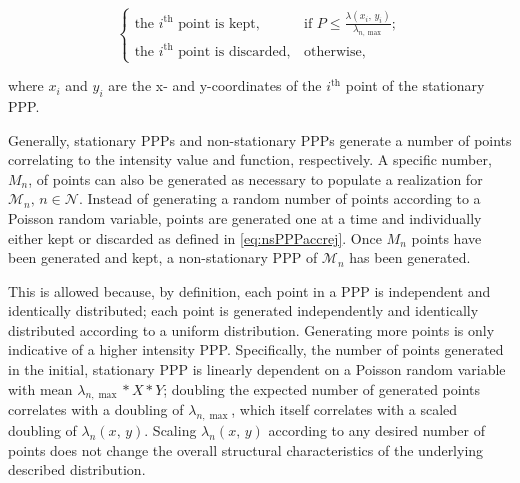 \documentclass[12pt,dvipsnames]{report}
\newif\ifisdoublespacing
\begin{document}
\ifisdoublespacing
\begin{singlespacing}
\begin{equation} \label{eq:nsPPPaccrej}
\begin{cases}
	\text{the $i^{\text{th}}$ point is kept},& \text{if } P \leq \frac{\lambda\left( x_i,\, y_i \right)}{\lambda_{n,\max}};\\
	\\
	\text{the $i^{\text{th}}$ point is discarded},& \text{otherwise,}
\end{cases}
\end{equation}
\end{singlespacing}
\else
\begin{equation} \label{eq:nsPPPaccrej}
\begin{cases}
	\text{the $i^{\text{th}}$ point is kept},& \text{if } P \leq \frac{\lambda\left( x_i,\, y_i \right)}{\lambda_{n,\max}};\\
	\text{the $i^{\text{th}}$ point is discarded},& \text{otherwise,}
\end{cases}
\end{equation}
\fi

\noindent where $x_i$ and $y_i$ are the x- and y-coordinates of the $i^{\text{th}}$ point of the stationary PPP.

Generally, stationary PPPs and non-stationary PPPs generate a number of points correlating to the intensity value and function, respectively.  A specific number, $M_n$, of points can also be generated as necessary to populate a realization for $\mathcal{M}_n,\, n \in \mathcal{N}$.  Instead of generating a random number of points according to a Poisson random variable, points are generated one at a time and individually either kept or discarded as defined in \cref{eq:nsPPPaccrej}.  Once $M_n$ points have been generated and kept, a non-stationary PPP of $\mathcal{M}_n$ has been generated.

This is allowed because, by definition, each point in a PPP is independent and identically distributed; each point is generated independently and identically distributed according to a uniform distribution.  Generating more points is only indicative of a higher intensity PPP.  Specifically, the number of points generated in the initial, stationary PPP is linearly dependent on a Poisson random variable with mean $\lambda_{n,\max} * X * Y$; doubling the expected number of generated points correlates with a doubling of $\lambda_{n,\max}$, which itself correlates with a scaled doubling of $\lambda_n \left( x,\, y \right)$.  Scaling $\lambda_n \left( x,\, y \right)$ according to any desired number of points does not change the overall structural characteristics of the underlying described distribution.
\end{document}
